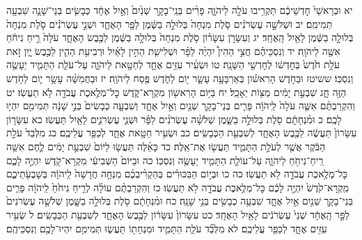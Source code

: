 \documentclass[twoside, openany, parskip=half, 11pt]{book}
\begin{document}
יא וּבְרָאשֵׁי֙ חׇדְשֵׁיכֶ֔ם תַּקְרִ֥יבוּ עֹלָ֖ה לַיהֹוָ֑ה פָּרִ֨ים בְּנֵֽי־בָקָ֤ר שְׁנַ֙יִם֙ וְאַ֣יִל אֶחָ֔ד כְּבָשִׂ֧ים בְּנֵי־שָׁנָ֛ה שִׁבְעָ֖ה תְּמִימִֽם׃ יב וּשְׁלֹשָׁ֣ה עֶשְׂרֹנִ֗ים סֹ֤לֶת מִנְחָה֙ בְּלוּלָ֣ה בַשֶּׁ֔מֶן לַפָּ֖ר הָאֶחָ֑ד וּשְׁנֵ֣י עֶשְׂרֹנִ֗ים סֹ֤לֶת מִנְחָה֙ בְּלוּלָ֣ה בַשֶּׁ֔מֶן לָאַ֖יִל הָֽאֶחָֽד׃ יג וְעִשָּׂרֹ֣ן עִשָּׂר֗וֹן סֹ֤לֶת מִנְחָה֙ בְּלוּלָ֣ה בַשֶּׁ֔מֶן לַכֶּ֖בֶשׂ הָאֶחָ֑ד עֹלָה֙ רֵ֣יחַ נִיחֹ֔חַ אִשֶּׁ֖ה לַיהֹוָֽה׃ יד וְנִסְכֵּיהֶ֗ם חֲצִ֣י הַהִין֩ יִהְיֶ֨ה לַפָּ֜ר וּשְׁלִישִׁ֧ת הַהִ֣ין לָאַ֗יִל וּרְבִיעִ֥ת הַהִ֛ין לַכֶּ֖בֶשׂ יָ֑יִן זֹ֣את עֹלַ֥ת חֹ֙דֶשׁ֙ בְּחׇדְשׁ֔וֹ לְחׇדְשֵׁ֖י הַשָּׁנָֽה׃ טו וּשְׂעִ֨יר עִזִּ֥ים אֶחָ֛ד לְחַטָּ֖את לַיהֹוָ֑ה עַל־עֹלַ֧ת הַתָּמִ֛יד יֵעָשֶׂ֖ה וְנִסְכּֽוֹ׃
ששיטז וּבַחֹ֣דֶשׁ הָרִאשׁ֗וֹן בְּאַרְבָּעָ֥ה עָשָׂ֛ר י֖וֹם לַחֹ֑דֶשׁ פֶּ֖סַח לַיהֹוָֽה׃ יז וּבַחֲמִשָּׁ֨ה עָשָׂ֥ר י֛וֹם לַחֹ֥דֶשׁ הַזֶּ֖ה חָ֑ג שִׁבְעַ֣ת יָמִ֔ים מַצּ֖וֹת יֵאָכֵֽל׃ יח בַּיּ֥וֹם הָרִאשׁ֖וֹן מִקְרָא־קֹ֑דֶשׁ כׇּל־מְלֶ֥אכֶת עֲבֹדָ֖ה לֹ֥א תַעֲשֽׂוּ׃ יט וְהִקְרַבְתֶּ֨ם אִשֶּׁ֤ה עֹלָה֙ לַֽיהֹוָ֔ה פָּרִ֧ים בְּנֵי־בָקָ֛ר שְׁנַ֖יִם וְאַ֣יִל אֶחָ֑ד וְשִׁבְעָ֤ה כְבָשִׂים֙ בְּנֵ֣י שָׁנָ֔ה תְּמִימִ֖ם יִהְי֥וּ לָכֶֽם׃ כ וּמִ֨נְחָתָ֔ם סֹ֖לֶת בְּלוּלָ֣ה בַשָּׁ֑מֶן שְׁלֹשָׁ֨ה עֶשְׂרֹנִ֜ים לַפָּ֗ר וּשְׁנֵ֧י עֶשְׂרֹנִ֛ים לָאַ֖יִל תַּעֲשֽׂוּ׃ כא עִשָּׂר֤וֹן עִשָּׂרוֹן֙ תַּעֲשֶׂ֔ה לַכֶּ֖בֶשׂ הָאֶחָ֑ד לְשִׁבְעַ֖ת הַכְּבָשִֽׂים׃ כב וּשְׂעִ֥יר חַטָּ֖את אֶחָ֑ד לְכַפֵּ֖ר עֲלֵיכֶֽם׃ כג מִלְּבַד֙ עֹלַ֣ת הַבֹּ֔קֶר אֲשֶׁ֖ר לְעֹלַ֣ת הַתָּמִ֑יד תַּעֲשׂ֖וּ אֶת־אֵֽלֶּה׃ כד כָּאֵ֜לֶּה תַּעֲשׂ֤וּ לַיּוֹם֙ שִׁבְעַ֣ת יָמִ֔ים לֶ֛חֶם אִשֵּׁ֥ה רֵֽיחַ־נִיחֹ֖חַ לַיהֹוָ֑ה עַל־עוֹלַ֧ת הַתָּמִ֛יד יֵעָשֶׂ֖ה וְנִסְכּֽוֹ׃ כה וּבַיּוֹם֙ הַשְּׁבִיעִ֔י מִקְרָא־קֹ֖דֶשׁ יִהְיֶ֣ה לָכֶ֑ם כׇּל־מְלֶ֥אכֶת עֲבֹדָ֖ה לֹ֥א תַעֲשֽׂוּ׃
כה כו וּבְי֣וֹם הַבִּכּוּרִ֗ים בְּהַקְרִ֨יבְכֶ֜ם מִנְחָ֤ה חֲדָשָׁה֙ לַֽיהֹוָ֔ה בְּשָׁבֻעֹ֖תֵיכֶ֑ם מִֽקְרָא־קֹ֙דֶשׁ֙ יִהְיֶ֣ה לָכֶ֔ם כׇּל־מְלֶ֥אכֶת עֲבֹדָ֖ה לֹ֥א תַעֲשֽׂוּ׃ כז וְהִקְרַבְתֶּ֨ם עוֹלָ֜ה לְרֵ֤יחַ נִיחֹ֙חַ֙ לַֽיהֹוָ֔ה פָּרִ֧ים בְּנֵי־בָקָ֛ר שְׁנַ֖יִם אַ֣יִל אֶחָ֑ד שִׁבְעָ֥ה כְבָשִׂ֖ים בְּנֵ֥י שָׁנָֽה׃ כח וּמִ֨נְחָתָ֔ם סֹ֖לֶת בְּלוּלָ֣ה בַשָּׁ֑מֶן שְׁלֹשָׁ֤ה עֶשְׂרֹנִים֙ לַפָּ֣ר הָֽאֶחָ֔ד שְׁנֵי֙ עֶשְׂרֹנִ֔ים לָאַ֖יִל הָאֶחָֽד׃ כט עִשָּׂרוֹן֙ עִשָּׂר֔וֹן לַכֶּ֖בֶשׂ הָאֶחָ֑ד לְשִׁבְעַ֖ת הַכְּבָשִֽׂים׃ ל שְׂעִ֥יר עִזִּ֖ים אֶחָ֑ד לְכַפֵּ֖ר עֲלֵיכֶֽם׃ לא מִלְּבַ֞ד עֹלַ֧ת הַתָּמִ֛יד וּמִנְחָת֖וֹ תַּעֲשׂ֑וּ תְּמִימִ֥ם יִהְיוּ־לָכֶ֖ם וְנִסְכֵּיהֶֽם׃
\end{document}
